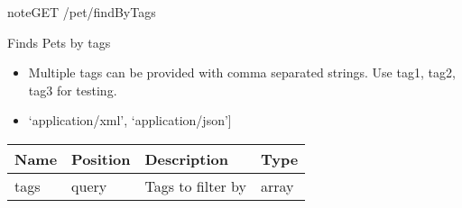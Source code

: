 \documentclass[letterpaper,10pt,english]{sphinxmanual}
\begin{document}
\begin{sphinxadmonition}{note}{GET /pet/findByTags}

Finds Pets by tags\begin{itemize}
\item {} 
Multiple tags can be provided with comma separated strings. Use tag1, tag2, tag3 for testing.

\item {} 
\sphinxstylestrong{Produces: 
}{[}‘application/xml’, ‘application/json’{]}

\end{itemize}




\begin{savenotes}\sphinxattablestart
\centering
\begin{tabulary}{\linewidth}[t]{|T|T|T|T|}
\hline
\sphinxstyletheadfamily 
Name
&\sphinxstyletheadfamily 
Position
&\sphinxstyletheadfamily 
Description
&\sphinxstyletheadfamily 
Type
\\
\hline
tags
&
query
&
Tags to filter by
&
array
\\
\hline
\end{tabulary}
\par
\sphinxattableend\end{savenotes}



\end{sphinxadmonition}
\end{document}
